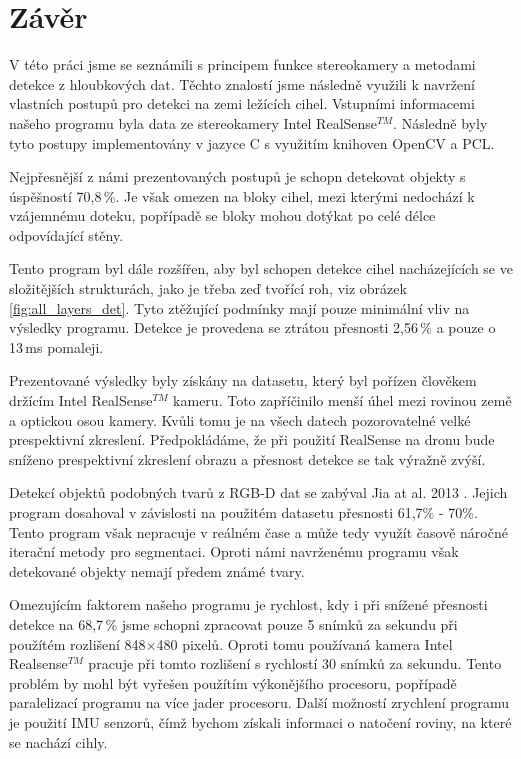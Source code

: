 \documentclass[twoside]{ctuthesis}
\newcommand{\CC}{C\nolinebreak\hspace{-.05em}\raisebox{.4ex}{\tiny\bf +}\nolinebreak\hspace{-.10em}\raisebox{.4ex}{\tiny\bf +}}
\begin{document}
\chapter{Závěr}
\label{sec:závěr}
V této práci jsme se seznámili s principem funkce stereokamery a metodami detekce z hloubkových dat. Těchto znalostí jsme následně využili k navržení vlastních postupů pro detekci na zemi ležících cihel. Vstupními informacemi našeho programu byla data ze stereokamery Intel\textregistered{} RealSense$^{TM}$. Následně byly tyto postupy implementovány v jazyce \CC{} s využitím knihoven OpenCV\cite{opencv_library} a PCL\cite{pcl}.

Nejpřesnější z námi prezentovaných postupů je schopn detekovat objekty s úspěšností 70,8\,\%. Je však omezen na bloky cihel, mezi kterými nedochází k vzájemnému doteku, popřípadě se bloky mohou dotýkat po celé délce odpovídající stěny.

Tento program byl dále rozšířen, aby byl schopen detekce cihel nacházejících se ve složitějších strukturách, jako je třeba zeď tvořící roh, viz obrázek \ref{fig:all_layers_det}. Tyto ztěžující podmínky mají pouze minimální vliv na výsledky programu. Detekce je provedena se ztrátou přesnosti 2,56\,\% a pouze o 13\,ms pomaleji.

Prezentované výsledky byly získány na datasetu, který byl pořízen člověkem držícím Intel\textregistered{}  RealSense$^{TM}$ kameru. Toto zapříčinilo menší úhel mezi rovinou země a optickou osou kamery. Kvůli tomu je na všech datech pozorovatelné velké prespektivní zkreslení. Předpokládáme, že při použití RealSense na dronu bude sníženo prespektivní zkreslení obrazu a přesnost detekce se tak výražně zvýší.

Detekcí objektů podobných tvarů z RGB-D dat se zabýval Jia at al. 2013 \cite{jia20133d}. Jejich program dosahoval v závislosti na použitém datasetu přesnosti 61,7\% - 70\%. Tento program však nepracuje v reálném čase a může tedy využít časově náročné iterační metody pro segmentaci. Oproti námi navrženému programu však detekované objekty nemají předem známé tvary.

Omezujícím faktorem našeho programu je rychlost, kdy i při snížené přesnosti detekce na 68,7\,\% jsme schopni zpracovat pouze 5 snímků za sekundu při použítém rozlišení 848$\times$480 pixelů. Oproti tomu používaná kamera Intel\textregistered{} Realsense$^{TM}$ pracuje při tomto rozlišení s rychlostí 30 snímků za sekundu. Tento problém by mohl být vyřešen použítím výkonějšího procesoru, popřípadě paralelizací programu na více jader procesoru. Další možností zrychlení programu je použití IMU senzorů, čímž bychom získali informaci o natočení roviny, na které se nachází cihly.
\end{document}
